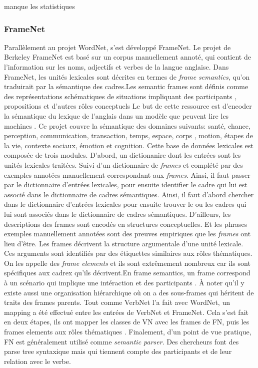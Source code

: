manque les statistiques

\subsubsection{FrameNet}

Parallèlement au projet WordNet, s'est développé FrameNet. Le projet de Berkeley FrameNet est basé sur un corpus manuellement annoté, qui contient de l'information sur les noms, adjectifs et verbes de la langue anglaise. Dans FrameNet, les unités lexicales sont décrites en termes de \emph{frame semantics}, qu'on traduirait par la sémantique des cadres.Les semantic frames sont définis comme des représentations schématiques de situations impliquant des participants , propositions et d'autres rôles conceptuels Le but de cette ressource est d'encoder la sémantique du lexique de l'anglais dans un modèle que peuvent lire les machines \citep{BakerBerkeleyFrameNetProject1998}. Ce projet couvre la sémantique des domaines suivants: santé, chance, perception, communication, transaction, temps, espace, corps , motion, étapes de la vie, contexte sociaux, émotion et cognition. Cette base de données lexicales est composée de trois modules. D'abord, un dictionanire dont les entrées sont les unités lexicales traitées. Suivi d'un dictionnaire de \emph{frames} et complété par des exemples annotées manuellement correspondant aux \emph{frames}. Ainsi, il faut passer par le dictionnaire d'entrées lexicales, pour ensuite identifier le cadre qui lui est associé dans le dictionnaire de cadres sémantiques. Ainsi, il faut d'abord chercher dans le dictionnaire d'entrées lexicales pour ensuite trouver le ou les cadres qui lui sont associés dans le dictionnaire de cadres sémantiques. D'ailleurs, les descriptions des frames sont encodés en structures conceptuelles. Et les phrases exemples manuellement annotées sont des preuves empiriques que les \emph{frames} ont lieu d'être. Les frames décrivent la structure argumentale d'une unité lexicale. Ces arguments sont identifiés par des étiquettes similaires aux rôles thématiques. On les appelle des \emph{frame elements} et ils sont extrêmement nombreux car ils sont spécifiques aux cadrex qu'ils décrivent.En frame semantics, un frame correspond à un scénario qui implique une intéraction et des participants \citep{Shi:2005:PPT:2132047.2132058}. À noter qu'il y existe aussi une organisation hiérarchique où on a des sous-frames qui héritent de traits des frames parents. Tout comme VerbNet l'a fait avec WordNet, un mapping a été effectué entre les entrées de VerbNet et FrameNet. Cela s'est fait en deux étapes, ils ont mapper les classes de VN avec les frames de FN, puis les frames elements aux rôles thématiques \citep{Shi:2005:PPT:2132047.2132058}. Finalement, d'un point de vue pratique, FN est généralement utilisé comme \emph{semantic parser}. Des chercheurs font des parse tree syntaxique mais qui tiennent compte des participants et de leur relation avec le verbe\citep{Shi:2005:PPT:2132047.2132058}.

